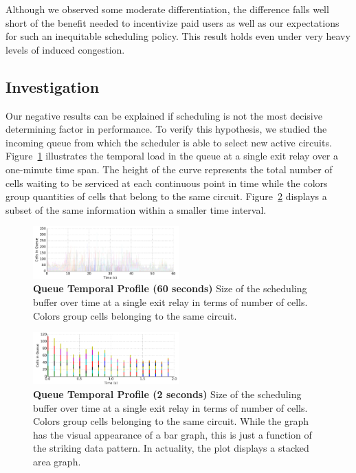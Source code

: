 Although we observed some moderate differentiation, the difference falls well
short of the benefit needed to incentivize paid users as well as our
expectations for such an inequitable scheduling policy. This result holds even
under very heavy levels of induced congestion.

\subsection{Investigation}

Our negative results can be explained if scheduling is not the most decisive
determining factor in performance. To verify this hypothesis, we studied the
incoming queue from which the scheduler is able to select new active
circuits. Figure~\ref{fig:scheduling_far} illustrates the temporal load in the
queue at a single exit relay over a one-minute time span. The height of the
curve represents the total number of cells waiting to be serviced at each
continuous point in time while the colors group quantities of cells that belong
to the same circuit. Figure~\ref{fig:scheduling_close} displays a subset of the
same information within a smaller time interval.


\begin{figure} \centering
  \includegraphics[width=0.5\textwidth]{images/scheduling_far.png}
  \caption[Queue Temporal Profile (60 seconds)]{\textbf{Queue Temporal Profile
      (60 seconds)} Size of the scheduling buffer over time at a single exit
    relay in terms of number of cells. Colors group cells belonging to the same circuit.}
  \label{fig:scheduling_far}
\end{figure}

\begin{figure} \centering
  \includegraphics[width=0.5\textwidth]{images/scheduling_close.png}
  \caption[Queue Temporal Profile (2 seconds)]{\textbf{Queue Temporal Profile
      (2 seconds)} Size of the scheduling buffer over time at a single exit
    relay in terms of number of cells. Colors group cells belonging to the same
    circuit. While the graph has the visual appearance of a bar graph, this is
    just a function of the striking data pattern. In actuality, the plot
    displays a stacked area graph.}
  \label{fig:scheduling_close}
\end{figure}


